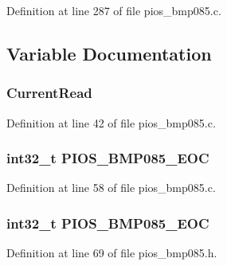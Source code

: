 \-Definition at line 287 of file pios\-\_\-bmp085.\-c.



\subsection{\-Variable \-Documentation}
\hypertarget{group___p_i_o_s___b_m_p085_ga1dd45e20832bd6d56c5bcc1b1773a204}{
\subsubsection[{\-Current\-Read}]{ {\bf \-Current\-Read}}}\label{group___p_i_o_s___b_m_p085_ga1dd45e20832bd6d56c5bcc1b1773a204}


\-Definition at line 42 of file pios\-\_\-bmp085.\-c.

\hypertarget{group___p_i_o_s___b_m_p085_ga4dd7fe8ef562b12c78ad0cfc1bf1fd8e}{
\subsubsection[{\-P\-I\-O\-S\-\_\-\-B\-M\-P085\-\_\-\-E\-O\-C}]{\setlength{\rightskip}{0pt plus 5cm}int32\-\_\-t {\bf \-P\-I\-O\-S\-\_\-\-B\-M\-P085\-\_\-\-E\-O\-C}}}\label{group___p_i_o_s___b_m_p085_ga4dd7fe8ef562b12c78ad0cfc1bf1fd8e}


\-Definition at line 58 of file pios\-\_\-bmp085.\-c.

\hypertarget{group___p_i_o_s___b_m_p085_ga4dd7fe8ef562b12c78ad0cfc1bf1fd8e}{
\subsubsection[{\-P\-I\-O\-S\-\_\-\-B\-M\-P085\-\_\-\-E\-O\-C}]{\setlength{\rightskip}{0pt plus 5cm}int32\-\_\-t {\bf \-P\-I\-O\-S\-\_\-\-B\-M\-P085\-\_\-\-E\-O\-C}}}\label{group___p_i_o_s___b_m_p085_ga4dd7fe8ef562b12c78ad0cfc1bf1fd8e}


\-Definition at line 69 of file pios\-\_\-bmp085.\-h.

